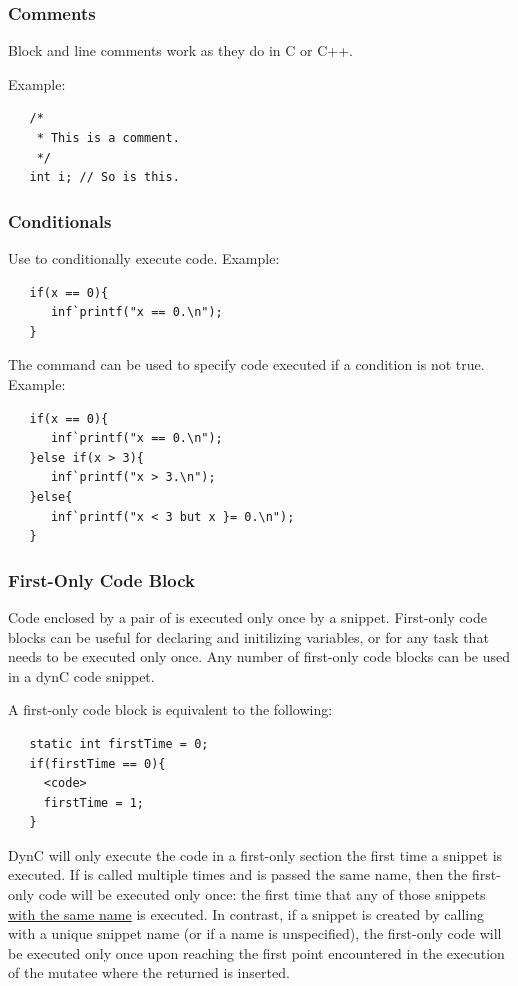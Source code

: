 \subsubsection{Comments}
Block and line comments work as they do in C or C++.

\noindent Example:
\begin{lstlisting}
   /*
    * This is a comment.
    */
   int i; // So is this.
\end{lstlisting}

\subsubsection{Conditionals}
Use  to conditionally execute code.
\noindent Example:
\begin{lstlisting}
   if(x == 0){
      inf`printf("x == 0.\n");
   }
\end{lstlisting}
The  command can be used to specify code executed if a condition is not true.
\noindent Example:
\begin{lstlisting}
   if(x == 0){
      inf`printf("x == 0.\n");
   }else if(x > 3){
      inf`printf("x > 3.\n");
   }else{
      inf`printf("x < 3 but x }= 0.\n");
   }
\end{lstlisting}

\subsubsection{First-Only Code Block}
\label{sec:firstOnly}
Code enclosed by a pair of  is executed only once by a
snippet. First-only code blocks can be useful for declaring and initilizing
variables, or for any task that needs to be executed only once. Any number of
first-only code blocks can be used in a dynC code snippet.

\noindent A first-only code block is equivalent to the following:
\begin{lstlisting}
   static int firstTime = 0;
   if(firstTime == 0){
     <code>
     firstTime = 1;
   }
\end{lstlisting}

DynC will only execute the code in a first-only section the first time a snippet
is executed. If  is called multiple times and is passed
the same name, then the first-only code will be executed only once: the first
time that any of those snippets \underline{with the same name} is executed. In
contrast, if a snippet is created by calling  with a
unique snippet name (or if a name is unspecified), the first-only code will be
executed only once upon reaching the first point encountered in the execution of
the mutatee where the returned  is inserted.


